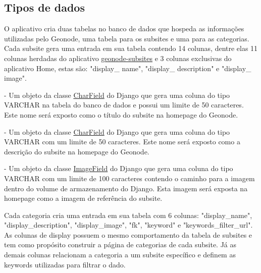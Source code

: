 \documentclass[12pt]{article}
\begin{document}
\subsection{Tipos de dados}

O aplicativo cria duas tabelas no banco de dados que hospeda as informações
utilizadas pelo Geonode, uma tabela para os subsites e uma para as categorias.
Cada subsite gera uma entrada em sua tabela contendo 14 colunas, dentre elas 11
colunas herdadas do aplicativo \textcolor{blue}{
\href{https://github.com/geosolutions-it/geonode-subsites}{geonode-subsites}} e
3 colunas exclusivas do aplicativo Home, estas são: "display\_ name",
"display\_ description" e "display\_ image". 

\begin{description}
  \setlength\itemsep{1em}
  \item[display\_name]
    - Um objeto da classe 
      \textcolor{blue}
      {\href{https://docs.djangoproject.com/en/5.0/ref/models/fields/#django.db.models.CharField}
      {CharField}} 
    do Django que gera uma coluna do tipo VARCHAR na tabela do
    banco de dados e possui um limite de 50 caracteres. Este nome será
    exposto como o título do subsite na homepage do Geonode.
    
  \item[display\_description]
  - Um objeto da classe 
      \textcolor{blue}
      {\href{https://docs.djangoproject.com/en/5.0/ref/models/fields/#django.db.models.CharField}
      {CharField}} 
    do Django que gera uma coluna do tipo VARCHAR com um limite de
    50 caracteres. Este nome será exposto como a descrição do subsite na
    homepage do Geonode.

  \item[display\_image]
  - Um objeto da classe
      \textcolor{blue}
      {\href{https://docs.djangoproject.com/en/5.0/ref/models/fields/#django.db.models.ImageField}
      {ImageField}} 
    do Django que gera uma coluna do tipo VARCHAR com um limite
    de 100 caracteres contendo o caminho para a imagem dentro do volume de
    armazenamento do Django. Esta imagem será exposta na homepage como a imagem
    de referência do subsite. 
\end{description}

Cada categoria cria uma entrada em sua tabela com 6 colunas: "display\_name",
"display\_description", "display\_image", "fk", "keyword" e
"keywords\_filter\_url". As colunas de display possuem o mesmo comportamento da
tabela de subsites e tem como propósito construir a página de categorias de
cada subsite. Já as demais colunas relacionam a categoria a um subsite
específico e definem as keywords utilizadas para filtrar o dado.
\end{document}
